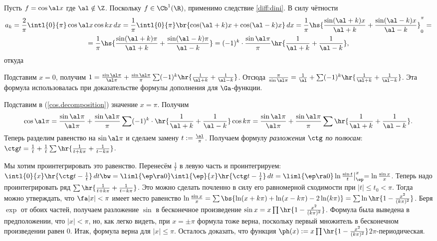 \documentclass[a4paper]{article}
\newcommand{\intlop}{\intl{0}{\pi}}
\newcommand{\frpi}{\frac{1}{\pi}}
\newcommand{\sbs}[2]{\bigl|_{{#1}}^{{#2}}}
\begin{document}
\begin{ex}
Пусть $f = \cos \al x$ где $\al \notin \Z$. Поскольку $f \in\Cb^1(\R)$, применимо следствие
\ref{diff:dini}. В силу чётности
\begin{multline*}
a_k = \frac{2}{\pi}\intlop\cos \al x \cos k x \,d x= \frpi
\intlop\br{\cos(\al + k)x + \cos(\al - k)x}\,d x = \frpi \hs{\frac{\sin(\al + k)x}{\al + k} +
\frac{\sin(\al-k)x}{\al - k}}_0^\pi=\\
=\frpi \hs{\frac{\sin(\al + k)\pi}{\al + k} +
\frac{\sin(\al-k)\pi}{\al - k}} = (-1)^k\cdot\frac{\sin \al \pi}{\pi}\hr{\frac{1}{\al + k} +
\frac{1}{\al - k}},
\end{multline*}
откуда

Подставим $x = 0$, получим
$1 = \frac{\sin \al \pi}{\al \pi} + \frac{\sin \al \pi}{\pi} \sum (-1)^k \hr{\frac{1}{\al + k} + \frac{1}{\al - k}}$.
Отсюда $\frac{\pi}{\sin \al \pi} = \frac{1}{\al} + \sum (-1)^k\hr{\frac{1}{\al + k} + \frac{1}{\al - k}}$.
Эта формула использовалась при доказательстве формулы дополнения для $\Ga$-функции.

Подставим в (\ref{cos.decomposition}) значение $x=\pi$. Получим
$$\cos\al\pi = \frac{\sin \al \pi}{\al\pi} + \frac{\sin \al \pi}{\pi}\sum (-1)^k\cdot
\hr{\frac{1}{\al + k} + \frac{1}{\al - k}}\cos k\pi=
\frac{\sin \al \pi}{\al\pi} + \frac{\sin \al \pi}{\pi}\sum \hr{\frac{1}{\al + k} + \frac{1}{\al - k}}.$$
Теперь разделим равенство на $\sin\al\pi$ и сделаем замену $t := \frac{\al}{\pi}$. Получаем
формулу \emph{разложения $\ctg$ по полюсам}:
$\ctg t = \frac{1}{t} + \frac{1}{t}\sum \hr{\frac{1}{t + k\pi} + \frac{1}{t - k\pi}}$.

Мы хотим проинтегрировать это равенство. Перенесём $\frac{1}{t}$ в левую часть и проинтегрируем:
$\intl{0}{x}\hr{\ctg t - \frac{1}{t}}\,d t  \bw= \liml{\ep\ra 0}\intl{\ep}{x}\hr{\ctg t -
\frac{1}{t}}\,d t = \liml{\ep\ra0}\ln \frac{\sin t}{t}\sbs{\ep}{x}= \ln \frac{\sin x}{x}$. Теперь
надо проинтегрировать ряд $\sum \hr{\frac{1}{t + k\pi} + \frac{1}{t - k\pi}}$. Это можно сделать
почленно в силу его равномерной сходимости при $|t| \le t_0 < \pi$. Тогда можно утверждать, что
$\fa |x| < \pi$ имеет место равенство $\ln \frac{\sin x}{x} = \sum\bs{\ln(x+k\pi) + \ln(x - k\pi) -
2\ln(k\pi)} = \sum\ln\hr{1 - \frac{x^2}{(k\pi)^2}}$. Беря $\exp$ от обоих частей, получаем
разложение $\sin$ в бесконечное произведение $\sin x = x \prod \hr{1 - \frac{x^2}{(k\pi)^2}}$.
Формула была выведена в предположении, что $|x| < \pi$, но, как легко видеть, при $x = \pm\pi$
формула тоже верна, поскольку первый множитель в бесконечном произведении равен 0. Итак, формула
верна для $|x| \le \pi$. Осталось доказать, что функция $\ph(x) := x \prod \hr{1 -
\frac{x^2}{(k\pi)^2}}$\т $2\pi$-периодическая.


\end{ex}
\end{document}
